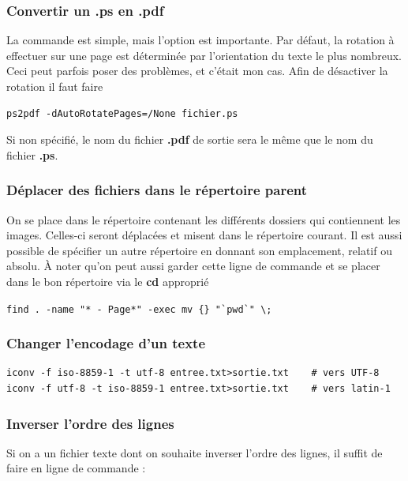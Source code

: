 \documentclass[a4paper,twoside]{article}
\begin{document}
\subsubsection{Convertir un .ps en .pdf}
La commande est simple, mais l'option est importante. Par défaut, la rotation à effectuer sur une page est déterminée par l'orientation du texte le plus nombreux. Ceci peut parfois poser des problèmes, et c'était mon cas. Afin de désactiver la rotation il faut faire 
\begin{verbatim}
ps2pdf -dAutoRotatePages=/None fichier.ps
\end{verbatim}

\begin{remarque}
Si non spécifié, le nom du fichier \textbf{.pdf} de sortie sera le même que le nom du fichier \textbf{.ps}.
\end{remarque}



\subsubsection{Déplacer des fichiers dans le répertoire parent}
On se place dans le répertoire contenant les différents dossiers qui contiennent les images. Celles-ci seront déplacées et misent dans le répertoire courant. Il est aussi possible de spécifier un autre répertoire en donnant son emplacement, relatif ou absolu. À noter qu'on peut aussi garder cette ligne de commande et se placer dans le bon répertoire via le \textbf{cd} approprié

\verb|find . -name "* - Page*" -exec mv {} "`pwd`" \;|

\subsubsection{Changer l'encodage d'un texte}
\begin{verbatim}
iconv -f iso-8859-1 -t utf-8 entree.txt>sortie.txt    # vers UTF-8
iconv -f utf-8 -t iso-8859-1 entree.txt>sortie.txt    # vers latin-1
\end{verbatim}

\subsubsection{Inverser l'ordre des lignes}

Si on a un fichier texte dont on souhaite inverser l'ordre des lignes, il suffit de faire en ligne de commande :
\end{document}
